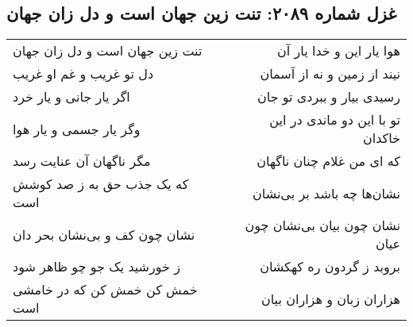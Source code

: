 \begin{center}
\section*{غزل شماره ۲۰۸۹: تنت زین جهان است و دل زان جهان}
\label{sec:2089}
\begin{longtable}{l p{0.5cm} r}
تنت زین جهان است و دل زان جهان
&&
هوا یار این و خدا یار آن
\\
دل تو غریب و غم او غریب
&&
نیند از زمین و نه از آسمان
\\
اگر یار جانی و یار خرد
&&
رسیدی بیار و ببردی تو جان
\\
وگر یار جسمی و یار هوا
&&
تو با این دو ماندی در این خاکدان
\\
مگر ناگهان آن عنایت رسد
&&
که ای من غلام چنان ناگهان
\\
که یک جذب حق به ز صد کوشش است
&&
نشان‌ها چه باشد بر بی‌نشان
\\
نشان چون کف و بی‌نشان بحر دان
&&
نشان چون بیان بی‌نشان چون عیان
\\
ز خورشید یک جو چو ظاهر شود
&&
بروبد ز گردون ره کهکشان
\\
خمش کن خمش کن که در خامشی است
&&
هزاران زبان و هزاران بیان
\\
\end{longtable}
\end{center}
